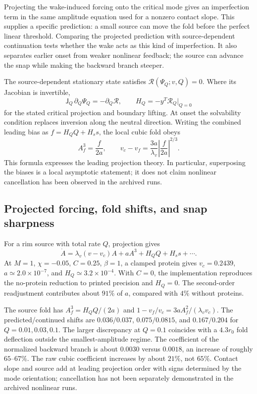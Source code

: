 Projecting the wake-induced forcing onto the critical mode gives an imperfection term in the same amplitude equation used for a nonzero contact slope. This supplies a specific prediction: a small source can move the fold before the perfect linear threshold. Comparing the projected prediction with source-dependent continuation tests whether the wake acts as this kind of imperfection. It also separates earlier onset from weaker nonlinear feedback; the source can advance the snap while making the backward branch steeper.


The source-dependent stationary state satisfies $\mathcal R(\Psi_Q;v,Q)=0$. Where its Jacobian is invertible,
\begin{equation}
\mathsf J_Q\,\partial_Q\Psi_Q=-\partial_Q\mathcal R,
\qquad H_Q=-y^T\mathcal R_Q\big|_{Q=0}
\label{eq:wake-response}
\end{equation}
for the stated critical projection and boundary lifting. At onset the solvability condition replaces inversion along the neutral direction. Writing the combined leading bias as $f=H_QQ+H_ss$, the local cubic fold obeys
\begin{equation}
A_f^3=\frac{f}{2a},\qquad
v_c-v_f=\frac{3a}{\lambda_v}\left|\frac{f}{2a}\right|^{2/3}.
\label{eq:combined-imperfection}
\end{equation}
This formula expresses the leading projection theory. In particular, superposing the biases is a local asymptotic statement; it does not claim nonlinear cancellation has been observed in the archived runs.

\subsection{Projected forcing, fold shifts, and snap sharpness}


For a rim source with total rate $Q$, projection gives
\begin{equation}
\dot A=\lambda_v(v-v_c)A+aA^3+H_QQ+H_s s+\cdots .
\end{equation}
At $M=1$, $\chi=-0.05$, $C=0.25$, $\beta=1$, a clamped protein gives $v_c=0.2439$, $a\simeq2.0\times10^{-7}$, and $H_Q\simeq3.2\times10^{-4}$. With $C=0$, the implementation reproduces the no-protein reduction to printed precision and $H_Q=0$. The second-order readjustment contributes about $91\%$ of $a$, compared with $4\%$ without proteins.

The source fold has $A_f^3=H_QQ/(2a)$ and $1-v_f/v_c=3aA_f^2/(\lambda_vv_c)$. The predicted/continued shifts are $0.036/0.037$, $0.075/0.0815$, and $0.167/0.204$ for $Q=0.01,0.03,0.1$. The larger discrepancy at $Q=0.1$ coincides with a $4.3r_0$ fold deflection outside the smallest-amplitude regime. The coefficient of the normalized backward branch is about $0.0030$ versus $0.0018$, an increase of roughly $65$--$67\%$. The raw cubic coefficient increases by about $21\%$, not $65\%$. Contact slope and source add at leading projection order with signs determined by the mode orientation; cancellation has not been separately demonstrated in the archived nonlinear runs.


